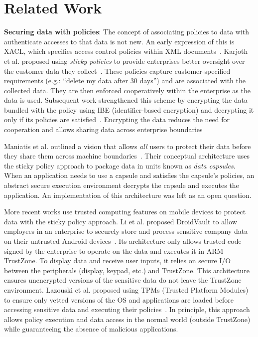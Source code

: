 \chapter{Related Work}
\label{sec:related}

\textbf{Securing data with policies}: The concept of associating policies to
data with authenticate accesses to that data is not new. An early expression of
this is XACL, which specifies access control policies within XML
documents~\cite{xacl}. Karjoth et al. proposed using {\em sticky policies} to
provide enterprises better oversight over the customer data they
collect~\cite{karjoth02enterprise}. These policies capture customer-specified
requirements (e.g.: ``delete my data after 30 days'') and are associated with
the collected data. They are then enforced cooperatively within the enterprise
as the data is used. Subsequent work strengthened this scheme by encrypting the
data bundled with the policy using IBE (identifier-based encryption) and
decrypting it only if its policies are satisfied~\cite{mont03stickypolicies,
pearson11stickypolicies}. Encrypting the data reduces the need for cooperation
and allows sharing data across enterprise boundaries

Maniatis et al. outlined a vision that allows {\em all} users to protect their
data before they share them across machine boundaries~\cite{datacapsules}. Their
conceptual architecture uses the sticky policy approach to package data in units
known as {\em data capsules}. When an application needs to use a capsule and
satisfies the capsule's policies, an abstract secure execution environment
decrypts the capsule and executes the application. An implementation of this
architecture was left as an open question.

More recent works use trusted computing features on mobile devices to protect
data with the sticky policy approach. Li et al. proposed DroidVault to allow
employees in an enterprise to securely store and process sensitive company data
on their untrusted Android devices~\cite{li14droidvault}. Its architecture only
allows trusted code signed by the enterprise to operate on the data and executes
it in ARM TrustZone.  To display data and receive user inputs, it relies on
secure I/O between the peripherals (display, keypad, etc.) and TrustZone. This
architecture ensures unencrypted versions of the sensitive data do not leave the
TrustZone environment. Lazouski et al. proposed using TPMs (Trusted Platform
Modules) to ensure only vetted versions of the OS and applications are loaded
before accessing sensitive data and executing their
policies~\cite{lazouski14stateful}. In principle, this approach allows policy
execution and data access in the normal world (outside TrustZone) while guaranteeing
the absence of malicious applications.

